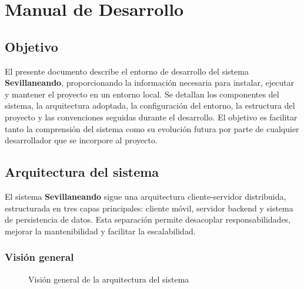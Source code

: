 \chapter{Manual de Desarrollo}\label{cap:manual_desarrollo}

\section{Objetivo}

El presente documento describe el entorno de desarrollo del sistema \textbf{Sevillaneando}, proporcionando la información necesaria para instalar, ejecutar y mantener el proyecto en un entorno local. Se detallan los componentes del sistema, la arquitectura adoptada, la configuración del entorno, la estructura del proyecto y las convenciones seguidas durante el desarrollo. El objetivo es facilitar tanto la comprensión del sistema como su evolución futura por parte de cualquier desarrollador que se incorpore al proyecto.

\section{Arquitectura del sistema}

El sistema \textbf{Sevillaneando} sigue una arquitectura cliente-servidor distribuida, estructurada en tres capas principales: cliente móvil, servidor backend y sistema de persistencia de datos. Esta separación permite desacoplar responsabilidades, mejorar la mantenibilidad y facilitar la escalabilidad.

\subsection{Visión general}

\begin{figure}[H]
    \centering
    \caption{Visión general de la arquitectura del sistema}
    \label{fig:arquitectura_general}
\end{figure}

